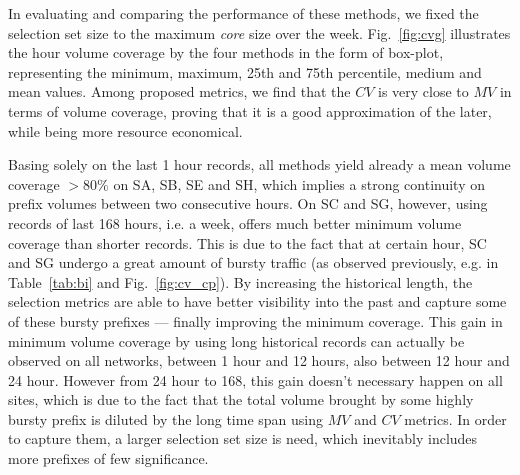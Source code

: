 In evaluating and comparing the performance of these methods, we fixed the selection set size to the maximum \textit{core} size over the week. 
Fig.~\ref{fig:cvg} illustrates the hour volume coverage by the four methods in the form of box-plot, representing the minimum, maximum, 25th and 75th percentile, medium and mean values. 
Among proposed metrics, we find that the $CV$ is very close to $MV$ in terms of volume coverage, proving that it is a good approximation of the later, while being more resource economical.

Basing solely on the last 1 hour records, all methods yield already a mean volume coverage $>80\%$ on SA, SB, SE and SH, which implies a strong continuity on prefix volumes between two consecutive hours. 
On SC and SG, however, using records of last 168 hours, i.e. a week, offers much better minimum volume coverage than shorter records. This is due to the fact that at certain hour, SC and SG undergo a great amount of bursty traffic (as observed previously, e.g. in Table~\ref{tab:bi} and Fig.~\ref{fig:cv_cp}). By increasing the historical length, the selection metrics are able to have better visibility into the past and capture some of these bursty prefixes ---  finally improving the minimum coverage.
This gain in minimum volume coverage by using long historical records can actually be observed on all networks, between 1 hour and 12 hours, also between 12 hour and 24 hour. 
However from 24 hour to 168, this gain doesn't necessary happen on all sites, which is due to the fact that the total volume brought by some highly bursty prefix is diluted by the long time span using $MV$ and $CV$ metrics. In order to capture them, a larger selection set size is need, which inevitably includes more prefixes of few significance.


